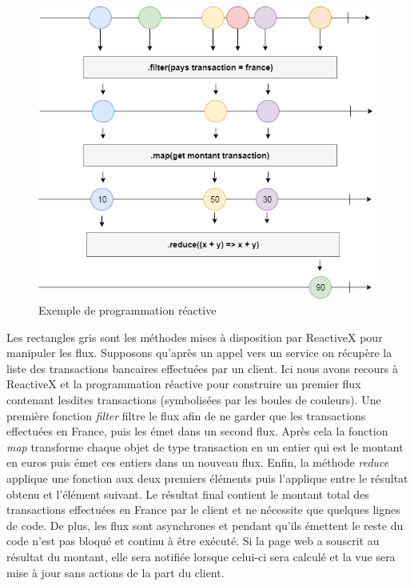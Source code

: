\begin{figure}[h!]
	\includegraphics[scale=0.50]{images/travailBP1818/architecture/reactivex.png}
	\centering
	\caption{Exemple de programmation réactive}
	\label{reactivex}
\end{figure}

	Les rectangles gris sont les méthodes mises à disposition par ReactiveX pour manipuler les flux. Supposons qu'après un appel vers un service on récupère la liste des transactions bancaires effectuées par un client. Ici nous avons recours à ReactiveX et la programmation réactive pour construire un premier flux contenant lesdites transactions (symbolisées par les boules de couleurs). Une première fonction \textit{filter} filtre le flux afin de ne garder que les transactions effectuées en France, puis les émet dans un second flux. Après cela la fonction \textit{map} transforme chaque objet de type transaction en un entier qui est le montant en euros puis émet ces entiers dans un nouveau flux. Enfin, la méthode \textit{reduce} applique une fonction aux deux premiers éléments puis l'applique entre le résultat obtenu et l'élément suivant. Le résultat final contient le montant total des transactions effectuées en France par le client et ne nécessite que quelques lignes de code. De plus, les flux sont asynchrones et pendant qu'ils émettent le reste du code n'est pas bloqué et continu à être exécuté. Si la page web a souscrit au résultat du montant, elle sera notifiée lorsque celui-ci sera calculé et la vue sera mise à jour sans actions de la part du client. \\

